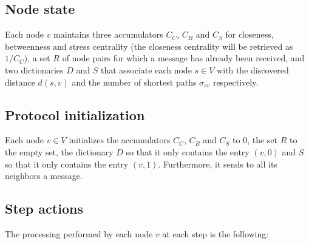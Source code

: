 \subsection{Node state}

Each node $v$ maintains three accumulators $C_C$, $C_B$ and $C_S$ for closeness, betweenness and stress centrality (the closeness centrality will be retrieved as $1/C_C$), a set $R$ of node pairs for which a \mrep{} message has already been received, and two dictionaries $D$ and $S$ that associate each node $s \in V$ with the discovered distance $d(s,v)$ and the number of shortest paths $\sigma_{sv}$ respectively.

\subsection{Protocol initialization}

Each node $v \in V$ initializes the accumulators $C_C$, $C_B$ and $C_S$ to $0$, the set $R$ to the empty set, the dictionary $D$ so that it only contains the entry $(v,0)$ and $S$ so that it only contains the entry $(v,1)$. Furthermore, it sends to all its neighbors a  message.

\subsection{Step actions}
The processing performed by each node $v$ at each step is the following:

